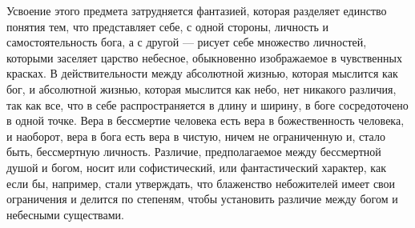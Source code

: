 \documentclass[12pt,oneside]{book}
\begin{document}
Усвоение этого предмета затрудняется фантазией, которая разделяет единство понятия тем, что представляет себе, с одной стороны, личность и самостоятельность бога, а с другой --- рисует себе множество личностей, которыми заселяет царство небесное, обыкновенно изображаемое в чувственных красках. В действительности между абсолютной жизнью, которая мыслится как бог, и абсолютной жизнью, которая мыслится как небо, нет никакого различия, так как все, что в себе распространяется в длину и ширину, в боге сосредоточено в одной точке. Вера в бессмертие человека есть вера в божественность человека, и наоборот, вера в бога есть вера в чистую, ничем не ограниченную и, стало быть, бессмертную личность. Различие, предполагаемое между бессмертной душой и богом, носит или софистический, или фантастический характер, как если бы, например, стали утверждать, что блаженство небожителей имеет свои ограничения и делится по степеням, чтобы установить различие между богом и небесными существами.
\end{document}
